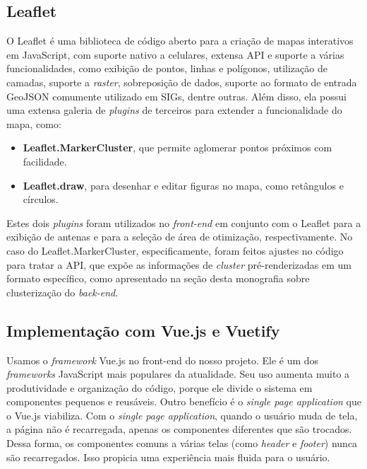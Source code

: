 \documentclass[]{politex}
\begin{document}
\subsection{Leaflet}

O Leaflet é uma biblioteca de código aberto para a criação de mapas interativos
em JavaScript, com suporte nativo a celulares, extensa API e suporte a várias
funcionalidades, como exibição de pontos, linhas e polígonos, utilização de
camadas, suporte a \textit{raster}, sobreposição de dados, suporte ao formato
de entrada GeoJSON comumente utilizado em SIGs, dentre outras. Além disso, ela
possui uma extensa galeria de \textit{plugins} de terceiros para extender a
funcionalidade do mapa, como:

\begin{itemize}
\item \textbf{Leaflet.MarkerCluster}, que permite aglomerar pontos próximos com
facilidade.
\item \textbf{Leaflet.draw}, para desenhar e editar figuras no mapa, como
retângulos e círculos.
\end{itemize}

Estes dois \textit{plugins} foram utilizados no \textit{front-end} em conjunto
com o Leaflet para a exibição de antenas e para a seleção de área de otimização,
respectivamente. No caso do Leaflet.MarkerCluster, especificamente, foram feitos
ajustes no código para tratar a API, que expõe as informações de
\textit{cluster} pré-renderizadas em um formato específico, como apresentado na
seção desta monografia sobre clusterização do \textit{back-end}.

\subsection{Implementação com Vue.js e Vuetify}

Usamos o \textit{framework} Vue.js no front-end do nosso projeto. Ele é um dos
\textit{frameworks} JavaScript mais populares da atualidade. Seu uso aumenta
muito a produtividade e organização do código, porque ele divide o sistema em
componentes pequenos e reusáveis. Outro benefício é o \textit{single page application} que o Vue.js viabiliza.
Com o \textit{single page application}, quando o usuário muda de tela, a página não é recarregada, apenas os
componentes diferentes que são trocados. Dessa forma, os componentes comuns a várias telas (como \textit{header} e \textit{footer})
nunca são recarregados. Isso propicia uma experiência mais fluida para o usuário.
\end{document}

